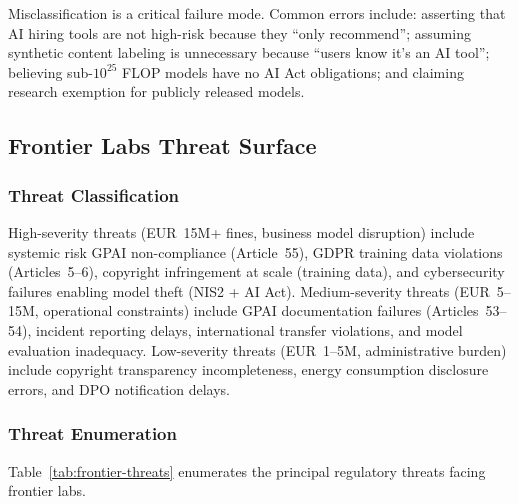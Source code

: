 \documentclass[11pt,a4paper]{article}
\begin{document}
Misclassification is a critical failure mode. Common errors include: asserting that AI hiring tools are not high-risk because they ``only recommend''; assuming synthetic content labeling is unnecessary because ``users know it's an AI tool''; believing sub-$10^{25}$ FLOP models have no AI Act obligations; and claiming research exemption for publicly released models.

\subsection{Frontier Labs Threat Surface}

\subsubsection{Threat Classification}

High-severity threats (EUR~15M+ fines, business model disruption) include systemic risk GPAI non-compliance (Article~55), GDPR training data violations (Articles~5--6), copyright infringement at scale (training data), and cybersecurity failures enabling model theft (NIS2 + AI Act). Medium-severity threats (EUR~5--15M, operational constraints) include GPAI documentation failures (Articles~53--54), incident reporting delays, international transfer violations, and model evaluation inadequacy. Low-severity threats (EUR~1--5M, administrative burden) include copyright transparency incompleteness, energy consumption disclosure errors, and DPO notification delays.

\subsubsection{Threat Enumeration}

Table~\ref{tab:frontier-threats} enumerates the principal regulatory threats facing frontier labs.
\end{document}
